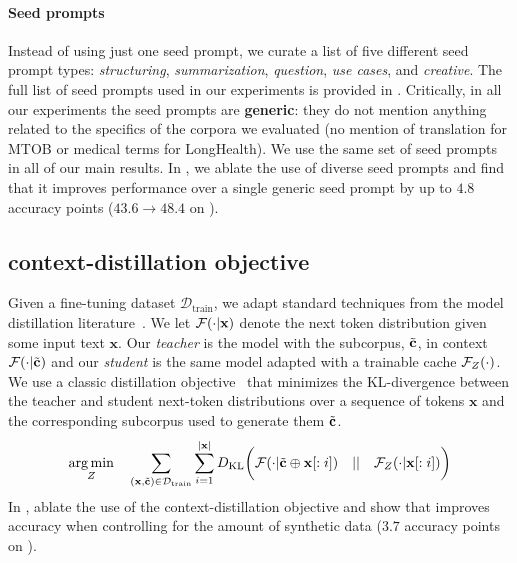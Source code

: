 \paragraph{Seed prompts}
Instead of using just one seed prompt, we curate a list of five different seed prompt types:     \textit{structuring}, \textit{summarization},
    \textit{question}, \textit{use cases}, and
    \textit{creative}.
The full list of seed prompts used in our experiments is provided in .
Critically, in all our experiments the seed prompts are \textbf{generic}: they do not mention anything related to the specifics of the corpora we evaluated (\eg no mention of translation for MTOB or medical terms for LongHealth).
We use the same set of seed prompts in all of our main results.
In , we ablate the use of diverse seed prompts and find that it improves performance over a single generic seed prompt by up to $4.8$ accuracy points ($43.6 \rightarrow 48.4$ on \longhealth).
\ifx\conference\icmlconf

\fi
\vspace{-2mm}
\subsection{\method context-distillation objective}
\label{sec:method-objective}
Given a fine-tuning dataset $\mathcal{D}_\text{train}$, we adapt standard techniques from the model distillation literature~\cite{kim2016sequence,snell2022learning,kujanpaa2024knowledge}. We let $\mathcal{F}(\cdot | \mathbf{x})$ denote the next token distribution given some input text $\mathbf{x}$. Our \textit{teacher} is the model with the subcorpus, $\tilde{\mathbf{c}}$, in context $\mathcal{F}( \cdot | \tilde{\mathbf{c}})$ and our \textit{student} is the same model adapted with a trainable cache   $\mathcal{F}_{Z}( \cdot)$.
We use a classic distillation objective~\cite{hinton2015distilling} that minimizes the KL-divergence between the teacher and student next-token distributions over a sequence of tokens $\mathbf{x}$ and the corresponding subcorpus used to generate them $\tilde{\mathbf{c}}$.
\vspace{-2mm}
\begin{equation}
    \underset{Z}{\arg\min} \quad
        \sum_{(\mathbf{x}, \tilde{\mathbf{c}}) \in \mathcal{D}_\text{train}}
            \sum_{i=1}^{|\mathbf{x}|}
                D_{\text{KL}}\bigg(
                    \mathcal{F}( \cdot | \tilde{\mathbf{c}} \oplus \mathbf{x}[:i]) \quad || \quad \mathcal{F}_{Z}( \cdot | \mathbf{x}[: i])
                \bigg)
\end{equation}
In , ablate the use of the context-distillation objective and show that improves accuracy when controlling for the amount of synthetic data (\eg $3.7$ accuracy points on \longhealth).


